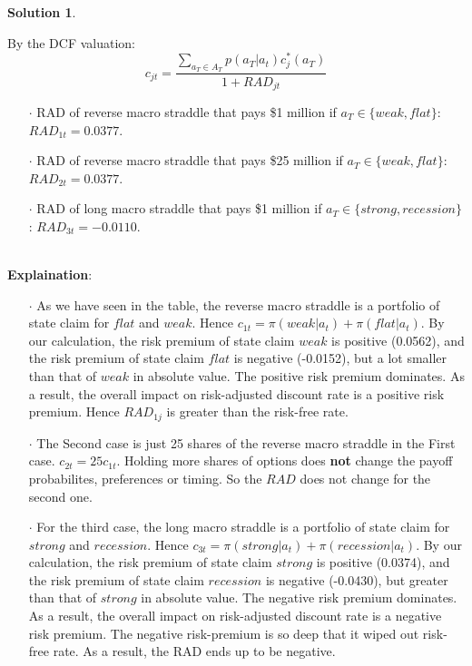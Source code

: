 \documentclass[a4paper, 10pt]{article}
\theoremstyle{definition}
\theoremstyle{hSol}
\newtheorem*{solution}{Solution}
\begin{document}
\begin{solution}
\begin{itemize}
\end{itemize}
By the DCF valuation:
\begin{equation}
  c_{jt} = \frac{\sum_{a_T\in A_T} p(a_T|a_t)c^*_j(a_T)}{1+RAD_{jt}}
\end{equation}
\begin{itemize}
  \item[$\cdot$] RAD of reverse macro straddle that pays \$1 million if $a_T \in \{weak, flat\}$: $RAD_{1t} = 0.0377$.
  \item[$\cdot$] RAD of reverse macro straddle that pays \$25 million if $a_T \in \{weak, flat\}$: $RAD_{2t} = 0.0377$.
  \item[$\cdot$] RAD of long macro straddle that pays \$1 million if $a_T \in \{strong, recession\}$: $RAD_{3t} = -0.0110$.
\end{itemize}
~\\
\textbf{Explaination}: 
\begin{itemize}
  \item[$\cdot$] As we have seen in the table, the reverse macro straddle is a portfolio of state claim for $flat$ and $weak$. Hence $c_{1t} = \pi(weak|a_t)+\pi(flat|a_t)$. By our calculation, the risk premium of state claim $weak$ is positive (0.0562), and the risk premium of state claim $flat$ is negative (-0.0152), but a lot smaller than that of $weak$ in absolute value. The positive risk premium dominates. As a result, the overall impact on risk-adjusted discount rate is a positive risk premium. Hence $RAD_{1j}$ is greater than the risk-free rate.
  \item[$\cdot$] The Second case is just 25 shares of the reverse macro straddle in the First case. $c_{2t} = 25c_{1t}$. Holding more shares of options does \textbf{not} change the payoff probabilites, preferences or timing. So the $RAD$ does not change for the second one.
  \item[$\cdot$] For the third case, the long macro straddle is a portfolio of state claim for $strong$ and $recession$. Hence $c_{3t} = \pi(strong|a_t)+\pi(recession|a_t)$. By our calculation, the risk premium of state claim $strong$ is positive (0.0374), and the risk premium of state claim $recession$ is negative (-0.0430), but greater than that of $strong$ in absolute value. The negative risk premium dominates. As a result, the overall impact on risk-adjusted discount rate is a negative risk premium. The negative risk-premium is so deep that it wiped out risk-free rate. As a result, the RAD ends up to be negative.
\end{itemize}




\end{solution}
\end{document}
